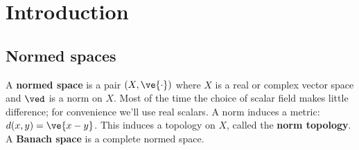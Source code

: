 \chapter{Introduction}


\section{Normed spaces}

\begin{df}
A \textbf{normed space} is a pair $(X,\ve{\cdot})$ where $X$ is a real or complex vector space and $\ved$ is a norm on $X$. Most of the time the choice of scalar field makes little difference; for convenience we'll use real scalars. A norm induces a metric: $d(x,y)=\ve{x-y}$. This induces a topology on $X$, called the \textbf{norm topology}. A \textbf{Banach space} is a complete normed space.
\end{df}
